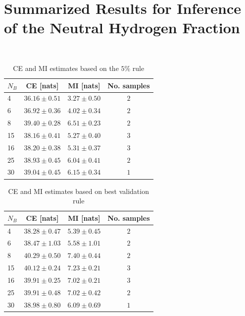 \section{Summarized Results for Inference of the Neutral Hydrogen Fraction}~\label{appendix1}

\begin{table}[htbp]
\centering
\caption{CE and MI estimates based on  the $5\%$ rule}
\begin{tabular}{l |c |c |c}
\toprule
$N_B$ & CE [nats]& MI [nats]& No. samples\\
\midrule
4  & $36.16 \pm 0.51$ & $3.27 \pm 0.50$ & $2$ \\
6  & $36.92 \pm 0.36$ & $4.02 \pm 0.34$ & $2$ \\
8  & $39.40 \pm 0.28$ & $6.51 \pm 0.23$ & $2$ \\
15 & $38.16 \pm 0.41$ & $5.27 \pm 0.40$ & $3$ \\
16 & $38.20 \pm 0.38$ & $5.31 \pm 0.37$ & $3$ \\
25 & $38.93 \pm 0.45$ & $6.04 \pm 0.41$ & $2$ \\
30 & $39.04 \pm 0.45$ & $6.15 \pm 0.34$ & $1$ \\

\bottomrule
\end{tabular}
\end{table}

\begin{table}[htbp]
\centering
\caption{CE and MI estimates based on best validation rule}
\begin{tabular}{l |c |c |c}
\toprule

$N_B$ & CE [nats] & MI [nats] & No. samples \\
\midrule
4  & $38.28 \pm 0.47$ & $5.39 \pm 0.45$ & $2$ \\
6  & $38.47 \pm 1.03$ & $5.58 \pm 1.01$ & $2$ \\
8  & $40.29 \pm 0.50$ & $7.40 \pm 0.44$ & $2$ \\
15 & $40.12 \pm 0.24$ & $7.23 \pm 0.21$ & $3$ \\
16 & $39.91 \pm 0.25$ & $7.02 \pm 0.21$ & $3$ \\
25 & $39.91 \pm 0.48$ & $7.02 \pm 0.42$ & $2$ \\
30 & $38.98 \pm 0.80$ & $6.09 \pm 0.69$ & $1$ \\

\bottomrule
\end{tabular}
\end{table}


